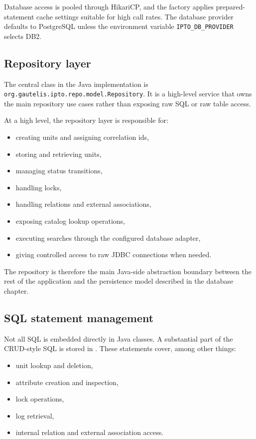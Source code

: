 Database access is pooled through HikariCP, and the factory applies prepared-statement cache settings suitable for high call rates. The database provider defaults to PostgreSQL unless the environment variable \texttt{IPTO\_DB\_PROVIDER} selects DB2.

\subsection{Repository layer}

The central class in the Java implementation is \texttt{org.gautelis.ipto.repo.model.Repository}. It is a high-level service that owns the main repository use cases rather than exposing raw SQL or raw table access.

At a high level, the repository layer is responsible for:
\begin{itemize}
\item creating units and assigning correlation ids,
\item storing and retrieving units,
\item managing status transitions,
\item handling locks,
\item handling relations and external associations,
\item exposing catalog lookup operations,
\item executing searches through the configured database adapter,
\item giving controlled access to raw JDBC connections when needed.
\end{itemize}

The repository is therefore the main Java-side abstraction boundary between the rest of the application and the persistence model described in the database chapter.

\subsection{SQL statement management}

Not all SQL is embedded directly in Java classes. A substantial part of the CRUD-style SQL is stored in . These statements cover, among other things:
\begin{itemize}
\item unit lookup and deletion,
\item attribute creation and inspection,
\item lock operations,
\item log retrieval,
\item internal relation and external association access.
\end{itemize}

